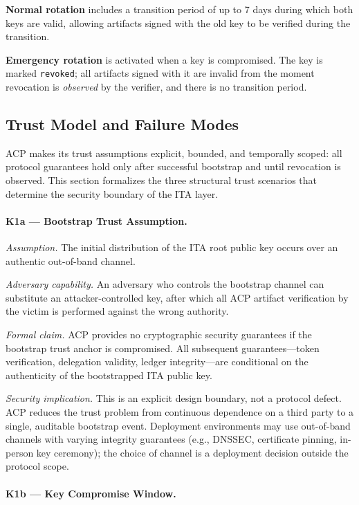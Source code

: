 \documentclass[11pt]{article}
\theoremstyle{definition}
\begin{document}
\textbf{Normal rotation} includes a transition period of up to 7 days during which both keys are valid,
allowing artifacts signed with the old key to be verified during the transition.

\textbf{Emergency rotation} is activated when a key is compromised.
The key is marked \texttt{revoked}; all artifacts signed with it are invalid
from the moment revocation is \emph{observed} by the verifier,
and there is no transition period.

\subsection{Trust Model and Failure Modes}
\label{sec:ita-trust-model}

ACP makes its trust assumptions explicit, bounded, and temporally scoped:
all protocol guarantees hold only after successful bootstrap and until revocation is observed.
This section formalizes the three structural trust scenarios that determine the security boundary
of the ITA layer.

\paragraph{K1a --- Bootstrap Trust Assumption.}

\textit{Assumption.}
The initial distribution of the ITA root public key occurs over an authentic out-of-band channel.

\textit{Adversary capability.}
An adversary who controls the bootstrap channel can substitute an attacker-controlled key,
after which all ACP artifact verification by the victim is performed against the wrong authority.

\textit{Formal claim.}
ACP provides no cryptographic security guarantees if the bootstrap trust anchor is compromised.
All subsequent guarantees---token verification, delegation validity, ledger integrity---are
conditional on the authenticity of the bootstrapped ITA public key.

\textit{Security implication.}
This is an explicit design boundary, not a protocol defect.
ACP reduces the trust problem from continuous dependence on a third party
to a single, auditable bootstrap event.
Deployment environments may use out-of-band channels with varying integrity guarantees
(e.g., DNSSEC, certificate pinning, in-person key ceremony);
the choice of channel is a deployment decision outside the protocol scope.

\paragraph{K1b --- Key Compromise Window.}
\end{document}
